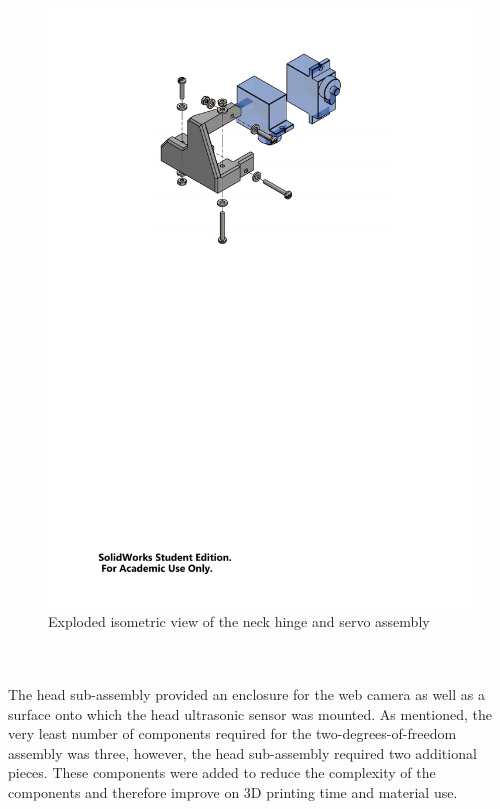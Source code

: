         \begin{figure}[h!]
          \centering
          \includegraphics[clip, trim=3cm 17cm 3cm 1cm, width=1\linewidth]{figures/neck-hinge-servo-sub-expl}
          \caption[Exploded isometric view of the neck hinge and servo assembly]{Exploded isometric view of the neck hinge and servo assembly}
          \label{fig:mechDesign-neckHingeServoSubExpl}
        \end{figure}

      \\\\
        The head sub-assembly provided an enclosure for the web camera as well as a surface onto which the head ultrasonic sensor was mounted. As mentioned, the very least number of components required for the two-degrees-of-freedom assembly was three, however, the head sub-assembly required two additional pieces. These components were added to reduce the complexity of the components and therefore improve on 3D printing time and material use.
        
